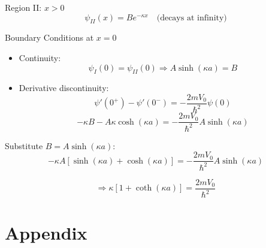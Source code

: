 \documentclass[12pt]{article}
\begin{document}
        Region II: \( x > 0 \)
        \[
            \psi_{II}(x) = B e^{-\kappa x}
            \quad \text{(decays at infinity)}
        \]
        
    Boundary Conditions at \( x = 0 \)
        \begin{itemize}
            \item Continuity:
            \[
                \psi_I(0) = \psi_{II}(0) \Rightarrow A \sinh(\kappa a) = B
            \]
        
            \item Derivative discontinuity:
            \[
                \psi'(0^+) - \psi'(0^-) = -\frac{2m V_0}{\hbar^2} \psi(0)
            \]
            \[
                -\kappa B - A \kappa \cosh(\kappa a) = -\frac{2m V_0}{\hbar^2} A \sinh(\kappa a)
            \]
        \end{itemize}
        
        Substitute \( B = A \sinh(\kappa a) \):
        \[
            - \kappa A \left[ \sinh(\kappa a) + \cosh(\kappa a) \right] = -\frac{2m V_0}{\hbar^2} A \sinh(\kappa a)
        \]
        
        \[
            \Rightarrow \kappa \left[ 1 + \coth(\kappa a) \right] = \frac{2m V_0}{\hbar^2}
        \]


\section{Appendix}
\end{document}
